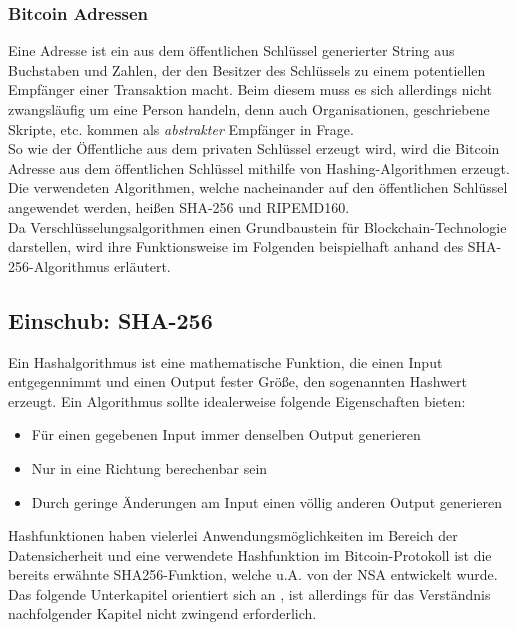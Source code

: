 \subsubsection{Bitcoin Adressen}
Eine Adresse ist ein aus dem öffentlichen Schlüssel generierter String aus Buchstaben und Zahlen, der den Besitzer des Schlüssels zu einem potentiellen Empfänger einer Transaktion macht. Beim diesem muss es sich allerdings nicht zwangsläufig um eine Person handeln, denn auch Organisationen, geschriebene Skripte, etc. kommen als \emph{abstrakter} Empfänger in Frage.\\
So wie der Öffentliche aus dem privaten Schlüssel erzeugt wird, wird die Bitcoin Adresse aus dem öffentlichen Schlüssel mithilfe von Hashing-Algorithmen erzeugt. 
Die verwendeten Algorithmen, welche nacheinander auf den öffentlichen Schlüssel angewendet werden, heißen SHA-256 und RIPEMD160.\\
Da Verschlüsselungsalgorithmen einen Grundbaustein für Blockchain-Technologie darstellen, wird ihre Funktionsweise im Folgenden beispielhaft anhand des SHA-256-Algorithmus erläutert. 

\subsection{Einschub: SHA-256}
Ein Hashalgorithmus ist eine mathematische Funktion, die einen Input entgegennimmt und einen Output fester Größe, den sogenannten Hashwert erzeugt. Ein Algorithmus sollte idealerweise folgende Eigenschaften bieten:
\begin{itemize}
	\item Für einen gegebenen Input immer denselben Output generieren
	\item Nur in eine Richtung berechenbar sein
	\item Durch geringe Änderungen am Input einen völlig anderen Output generieren
\end{itemize}

Hashfunktionen haben vielerlei Anwendungsmöglichkeiten im Bereich der Datensicherheit und eine verwendete Hashfunktion im Bitcoin-Protokoll ist die bereits erwähnte SHA256-Funktion, welche u.A. von der NSA entwickelt wurde. Das folgende Unterkapitel orientiert sich an \cite{dang_2015}, ist allerdings für das Verständnis nachfolgender Kapitel nicht zwingend erforderlich.\\

